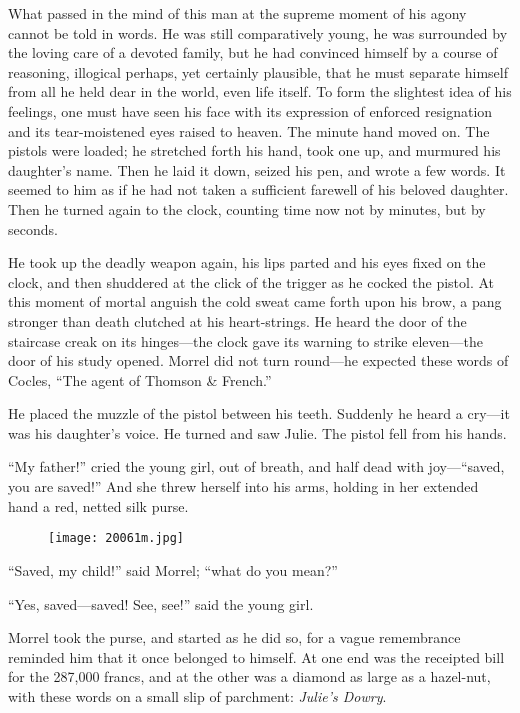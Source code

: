 What passed in the mind of this man at the supreme moment of his agony
cannot be told in words. He was still comparatively young, he was
surrounded by the loving care of a devoted family, but he had convinced
himself by a course of reasoning, illogical perhaps, yet certainly
plausible, that he must separate himself from all he held dear in the
world, even life itself. To form the slightest idea of his feelings,
one must have seen his face with its expression of enforced resignation
and its tear-moistened eyes raised to heaven. The minute hand moved on.
The pistols were loaded; he stretched forth his hand, took one up, and
murmured his daughter’s name. Then he laid it down, seized his pen, and
wrote a few words. It seemed to him as if he had not taken a sufficient
farewell of his beloved daughter. Then he turned again to the clock,
counting time now not by minutes, but by seconds.

He took up the deadly weapon again, his lips parted and his eyes fixed
on the clock, and then shuddered at the click of the trigger as he
cocked the pistol. At this moment of mortal anguish the cold sweat came
forth upon his brow, a pang stronger than death clutched at his
heart-strings. He heard the door of the staircase creak on its
hinges—the clock gave its warning to strike eleven—the door of his
study opened. Morrel did not turn round—he expected these words of
Cocles, “The agent of Thomson \& French.”

He placed the muzzle of the pistol between his teeth. Suddenly he heard
a cry—it was his daughter’s voice. He turned and saw Julie. The pistol
fell from his hands.

“My father!” cried the young girl, out of breath, and half dead with
joy—“saved, you are saved!” And she threw herself into his arms,
holding in her extended hand a red, netted silk purse.

\begin{figure}[h]
\texttt{[image: 20061m.jpg]}
\end{figure}

“Saved, my child!” said Morrel; “what do you mean?”

“Yes, saved—saved! See, see!” said the young girl.

Morrel took the purse, and started as he did so, for a vague
remembrance reminded him that it once belonged to himself. At one end
was the receipted bill for the 287,000 francs, and at the other was a
diamond as large as a hazel-nut, with these words on a small slip of
parchment: \textit{Julie’s Dowry}.

